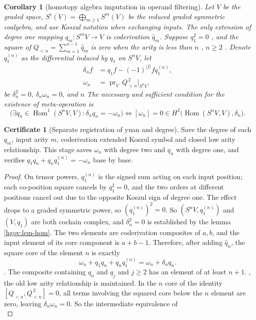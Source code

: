 \documentclass[12pt,a4paper,openany,notitlepage]{report}
\theoremstyle{plain}
\newtheorem{corollary}[theorem]{Corollary}
\theoremstyle{definition}
\newtheorem*{certificate}{Certificate}
\theoremstyle{remark}
\begin{document}
\begin{CJK*}
\begin{corollary}
[homotopy algebra imputation in operand filtering]\label{hgov:cor-arity}
Let $V$ be the graded space, $S^c(V)=\bigoplus_{m\ge1}S^m(V)$ be the reduced graded symmetric coalgebra, and use Koszul notation when exchanging inputs. The only extension of degree one mapping $q_m:S^mV\to V$ is coderivation $\widehat q_m$. Suppose $q_1^2=0$ , and the square of $Q_{<n}=\sum_{m=1}^{n-1}\widehat q_m$ is zero when the arity is less than $n$ , $n\ge2$ . Denote $q_1^{(n)}$ as the differential induced by $q_1$ on $S^nV$, let \[
 \begin{aligned}
 \delta_nf&=q_1f-(-1)^{|f|}f q_1^{(n)},\\
 \omega_n&=
 \operatorname{pr}_{V}\,Q_{<n}^{\,2}\big|_{S^nV}.
 \end{aligned}
\] be $\delta_n^2=0$, $\delta_n\omega_n=0$, and $n$ The necessary and sufficient condition for the existence of meta-operation is \[
 \bigl(\exists q_n\in\operatorname{Hom}^1(S^nV,V):
 \delta_nq_n=-\omega_n\bigr)
 \Longleftrightarrow
 [\omega_n]=0
 \in H^2\bigl(\operatorname{Hom}(S^nV,V),\delta_n\bigr).
\]\end{corollary}
\begin{certificate}
[Separate registration of yuan and degree]Save the degree of each $q_m$, input arity $m$, coderivation extended Koszul symbol and closed low arity relationship. This stage saves $\omega_n$ with degree two and $q_n$ with degree one, and verifies $q_1q_n+q_nq_1^{(n)}=-\omega_n$ base by base.\end{certificate}
\begin{proof}
On tensor powers, $q_1^{(n)}$ is the signed sum acting on each input position; each co-position square cancels by $q_1^2=0$, and the two orders at different positions cancel out due to the opposite Koszul sign of degree one. The effect drops to a graded symmetric power, so $(q_1^{(n)})^2=0$. So $(S^nV,q_1^{(n)})$ and $(V,q_1)$ are both cochain complex, and $\delta_n^2=0$ is established by the lemma ~ \ref{hgov:lem-hom}. The two elements are coderivation composites of $a,b$, and the input element of its core component is $a+b-1$. Therefore, after adding $\widehat q_n$, the square core of the element $n$ is exactly \[
 \omega_n+q_1q_n+q_nq_1^{(n)}
 =\omega_n+\delta_nq_n.
\]. The composite containing $q_n$ and $q_j$ and $j\ge2$ has an element of at least $n+1$. , the old low arity relationship is maintained. In the $n$ core of the identity $[Q_{<n},Q_{<n}^{\,2}]=0$, all terms involving the squared core below the $n$ element are zero, leaving $\delta_n\omega_n=0$. So the intermediate equivalence of \[
\]
\end{proof}
\end{CJK*}
\end{document}
